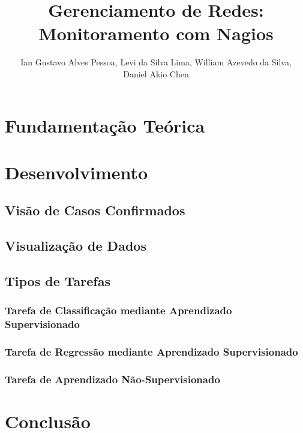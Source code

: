 \documentclass[12pt]{article}
\title{Gerenciamento de Redes:\\ Monitoramento com Nagios}
\author{
Ian Gustavo Alves Pessoa\inst{1}, Levi da Silva Lima\inst{2}, William Azevedo da Silva\inst{3}, \\Daniel Akio Chen\inst{4} }
\begin{document}
 

\maketitle



\section{Fundamentação Teórica}



\section{Desenvolvimento}

\subsection{Visão de Casos Confirmados}



\subsection{Visualização de Dados}



\subsection{Tipos de Tarefas}

\subsubsection{Tarefa de Classificação mediante Aprendizado Supervisionado}



\subsubsection{Tarefa de Regressão mediante Aprendizado Supervisionado}



\subsubsection{Tarefa de Aprendizado Não-Supervisionado}






\section{Conclusão}



\nocite{*}


\end{document}
